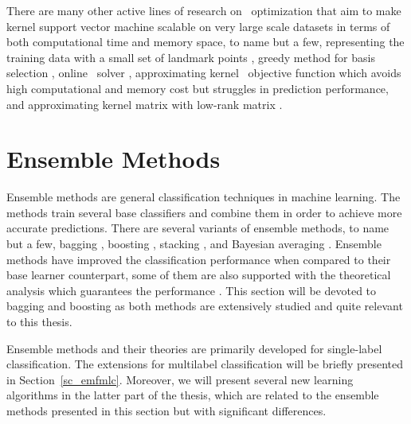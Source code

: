 {There are many other active lines of research on \svm\ optimization that aim to make kernel support vector machine scalable on very large scale datasets in terms of both computational time and memory space, to name but a few, representing the training data with a small set of landmark points \citep{Pavlov00towards,Boley04training,Yu05making,Zhang08improved}, greedy method for basis selection \citep{Keerthi06building}, online \svm\ solver \citep{Bordes05fast}, approximating kernel \svm\ objective function \citep{Zhang12scaling, Le13fast} which avoids high computational and memory cost but struggles in prediction performance, and approximating kernel matrix with low-rank matrix \citep{Smola00sparse,Fine02efficient,Drineas05on,Si14memory}.
\fi


%
%
%
\section{Ensemble Methods} \label{sc_em}

Ensemble methods are general classification techniques in machine learning.
The methods train several base classifiers and combine them in order to achieve more accurate predictions.
There are several variants of ensemble methods, to name but a few, 
bagging \citep{Breiman96bagging}, 
boosting \citep{Freund97a,Schapire99improved}, 
stacking \citep{Smyth99linearly}, 
and Bayesian averaging \citep{Freund04generalization}.
Ensemble methods have improved the classification performance when compared to their base learner counterpart, some of them are also supported with the theoretical analysis which guarantees the performance \citep{Schapire97boosting,Koltchinskii00empirical,Cortes14semble,Cortes14deep}.
This section will be devoted to bagging and boosting as both methods are extensively studied and quite relevant to this thesis.

Ensemble methods and their theories are primarily developed for single-label classification.
The extensions for multilabel classification will be briefly presented in Section~\ref{sc_emfmlc}.
Moreover, we will present several new learning algorithms in the latter part of the thesis, which are related to the ensemble methods presented in this section but with significant differences.



}
